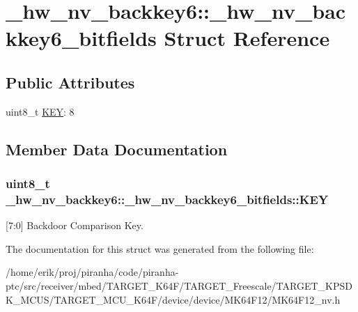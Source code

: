 \hypertarget{struct__hw__nv__backkey6_1_1__hw__nv__backkey6__bitfields}{}\section{\+\_\+hw\+\_\+nv\+\_\+backkey6\+:\+:\+\_\+hw\+\_\+nv\+\_\+backkey6\+\_\+bitfields Struct Reference}
\label{struct__hw__nv__backkey6_1_1__hw__nv__backkey6__bitfields}
\subsection*{Public Attributes}
\begin{DoxyCompactItemize}
\item 
uint8\+\_\+t \hyperlink{struct__hw__nv__backkey6_1_1__hw__nv__backkey6__bitfields_aeb84b4829febc1b113d3cba3917cb3c4}{K\+EY}\+: 8
\end{DoxyCompactItemize}


\subsection{Member Data Documentation}
\subsubsection[{\texorpdfstring{K\+EY}{KEY}}]{\setlength{\rightskip}{0pt plus 5cm}uint8\+\_\+t \+\_\+hw\+\_\+nv\+\_\+backkey6\+::\+\_\+hw\+\_\+nv\+\_\+backkey6\+\_\+bitfields\+::\+K\+EY}\hypertarget{struct__hw__nv__backkey6_1_1__hw__nv__backkey6__bitfields_aeb84b4829febc1b113d3cba3917cb3c4}{}\label{struct__hw__nv__backkey6_1_1__hw__nv__backkey6__bitfields_aeb84b4829febc1b113d3cba3917cb3c4}
\mbox{[}7\+:0\mbox{]} Backdoor Comparison Key. 

The documentation for this struct was generated from the following file\+:\begin{DoxyCompactItemize}
\item 
/home/erik/proj/piranha/code/piranha-\/ptc/src/receiver/mbed/\+T\+A\+R\+G\+E\+T\+\_\+\+K64\+F/\+T\+A\+R\+G\+E\+T\+\_\+\+Freescale/\+T\+A\+R\+G\+E\+T\+\_\+\+K\+P\+S\+D\+K\+\_\+\+M\+C\+U\+S/\+T\+A\+R\+G\+E\+T\+\_\+\+M\+C\+U\+\_\+\+K64\+F/device/device/\+M\+K64\+F12/M\+K64\+F12\+\_\+nv.\+h\end{DoxyCompactItemize}
